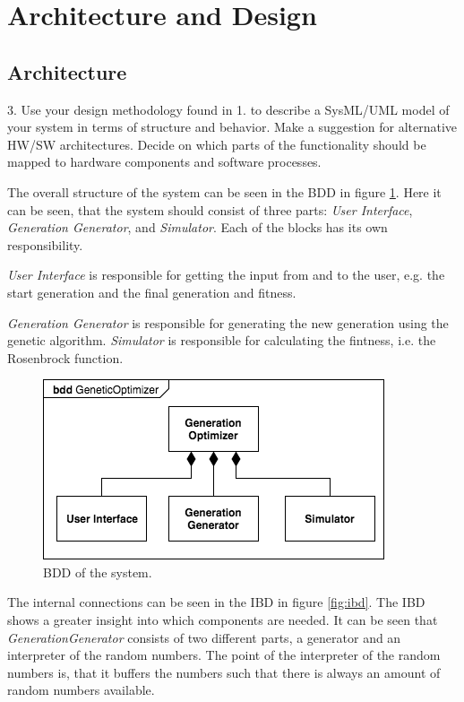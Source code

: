 \section{Architecture and Design}\label{sec:archdesign}

\subsection{Architecture}
\begin{framed}
3. Use your design methodology found in 1. to describe a SysML/UML model of your system in terms of structure and behavior. Make a suggestion for alternative HW/SW architectures. Decide on which parts of the functionality should be mapped to hardware components and software processes.
\end{framed}

The overall structure of the system can be seen in the BDD in figure \ref{fig:bdd}. Here it can be seen, that the system should consist of three parts: \emph{User Interface}, \emph{Generation Generator}, and \emph{Simulator}. Each of the blocks has its own responsibility. 

\emph{User Interface} is responsible for getting the input from and to the user, e.g. the start generation and the final generation and fitness. 

\emph{Generation Generator} is responsible for generating the new generation using the genetic algorithm. \emph{Simulator} is responsible for calculating the fintness, i.e. the Rosenbrock function.

\begin{figure}[htbp]
\begin{centering}
\includegraphics[width=0.7\linewidth]{../diagrams/bdd.png}
\caption{BDD of the system.}
\label{fig:bdd}
\end{centering}
\end{figure}

The internal connections can be seen in the IBD in figure \ref{fig:ibd}. The IBD shows a greater insight into which components are needed. It can be seen that \emph{GenerationGenerator} consists of two different parts, a generator and an interpreter of the random numbers. The point of the interpreter of the random numbers is, that it buffers the numbers such that there is always an amount of random numbers available.

